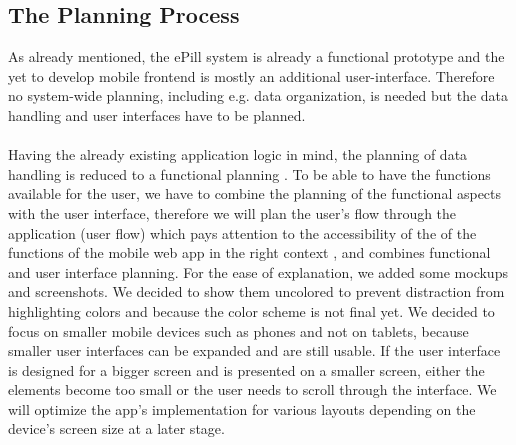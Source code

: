 \subsection{The Planning Process}
\label{subsec:Planning}
As already mentioned, the ePill system is already a functional prototype and the yet to develop mobile frontend is mostly an additional user-interface. Therefore no system-wide planning, including e.g. data organization, is needed but the data handling and user interfaces have to be planned.
\\
\\
Having the already existing application logic in mind, the planning of data handling is reduced to a functional planning . To be able to have the functions available for the user, we have to combine the planning of the functional aspects with the user interface, therefore we will plan the user's flow through the application (user flow) which pays attention to the accessibility of the of the functions of the mobile web app in the right context , and combines functional and user interface planning. For the ease of explanation, we added some mockups and screenshots. We decided to show them uncolored to prevent distraction from highlighting colors and because the color scheme is not final yet. We decided to focus on smaller mobile devices such as phones and not on tablets, because smaller user interfaces can be expanded and are still usable. If the user interface is designed for a bigger screen and is presented on a smaller screen, either the elements become too small or the user needs to scroll through the interface. We will optimize the app's implementation for various layouts depending on the device's screen size at a later stage.
\\
